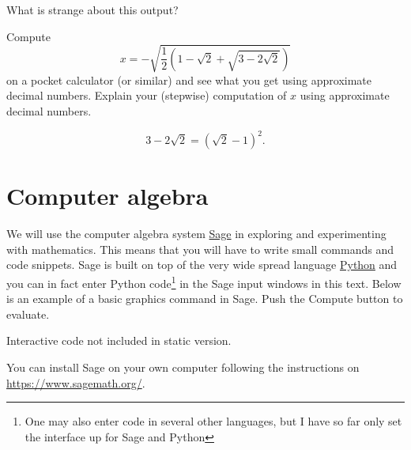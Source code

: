 \begin{tcolorbox}
  \begin{exercise}
    What is strange about this output?

    \begin{hint}
      Compute
      $$
        x = -\sqrt{\frac{1}{2} \left(1 - \sqrt{2} + \sqrt{3 - 2\sqrt{2}}\right)}
      $$
      on a pocket calculator (or similar) and see what you get using approximate decimal numbers.
      Explain your (stepwise) computation of $x$ using approximate decimal numbers.

      \begin{hint}
        $$
          3 - 2 \sqrt{2} = (\sqrt{2} - 1)^2.
        $$
      \end{hint}
    \end{hint}
  \end{exercise}

\end{tcolorbox}

\section{Computer algebra}

We will use the computer algebra system
\href{https://www.sagemath.org/}{Sage} in exploring and experimenting
with mathematics. This means that you will have to write small
commands and code snippets. Sage is built on top of the very wide
spread language
\href{https://en.wikipedia.org/wiki/Python\_(programming\_language)}{Python}
and you can in fact enter Python code\footnote{One may also enter code in several other languages, but I have so far only set the interface up for Sage and Python} in
the Sage input windows in this text. Below is an example of a basic
graphics command in Sage.  Push the Compute button to evaluate.

\begin{sage} Interactive code not included in static version.\end{sage}

You can install Sage on your own computer following the instructions on
\href{https://www.sagemath.org/}{https://www.sagemath.org/}.

